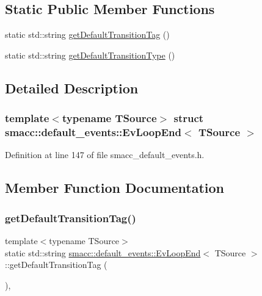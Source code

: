 \subsection*{Static Public Member Functions}
\begin{DoxyCompactItemize}
\item 
static std\+::string \hyperlink{structsmacc_1_1default__events_1_1EvLoopEnd_af7b3176144e2e2aa4ff11846f0896fa9}{get\+Default\+Transition\+Tag} ()
\item 
static std\+::string \hyperlink{structsmacc_1_1default__events_1_1EvLoopEnd_a9e05a6de331e6926fdcaa1ef13a6bd3c}{get\+Default\+Transition\+Type} ()
\end{DoxyCompactItemize}


\subsection{Detailed Description}
\subsubsection*{template$<$typename T\+Source$>$\newline
struct smacc\+::default\+\_\+events\+::\+Ev\+Loop\+End$<$ T\+Source $>$}



Definition at line 147 of file smacc\+\_\+default\+\_\+events.\+h.



\subsection{Member Function Documentation}
\mbox{\label{structsmacc_1_1default__events_1_1EvLoopEnd_af7b3176144e2e2aa4ff11846f0896fa9}} 
\subsubsection{\texorpdfstring{get\+Default\+Transition\+Tag()}{getDefaultTransitionTag()}}
{\footnotesize\ttfamily template$<$typename T\+Source$>$ \\
static std\+::string \hyperlink{structsmacc_1_1default__events_1_1EvLoopEnd}{smacc\+::default\+\_\+events\+::\+Ev\+Loop\+End}$<$ T\+Source $>$\+::get\+Default\+Transition\+Tag (\begin{DoxyParamCaption}{ }\end{DoxyParamCaption})\hspace{0.3cm}{\ttfamily [inline]}, {\ttfamily [static]}}




